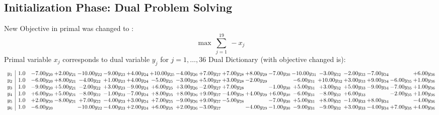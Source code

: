 \documentclass[9pt]{article}
\begin{document}
\subsection{Initialization Phase: Dual Problem Solving}
New Objective in primal was changed to : \[ \max\ \sum_{j=1}^{19}\ - x_j \] 
Primal variable $x_j$ corresponds to dual variable $y_j$ for $j = 1,\ldots,36$
Dual Dictionary (with objective changed is): 
\[\begin{array}{c| c c@{\hskip 2pt} c@{\hskip 2pt} c@{\hskip 2pt} c@{\hskip 2pt} c@{\hskip 2pt} c@{\hskip 2pt} c@{\hskip 2pt} c@{\hskip 2pt} c@{\hskip 2pt} c@{\hskip 2pt} c@{\hskip 2pt} c@{\hskip 2pt} c@{\hskip 2pt} c@{\hskip 2pt} c@{\hskip 2pt} c@{\hskip 2pt} c@{\hskip 2pt} }
 y_{1}   &  1.0 & -7.00 y_{20} & +  2.00 y_{21} & -10.00 y_{22} & -9.00 y_{23} & +  4.00 y_{24} & + 10.00 y_{25} & -4.00 y_{26} & +  7.00 y_{27} & +  7.00 y_{28} & +  8.00 y_{29} & -7.00 y_{30} & -10.00 y_{31} & -3.00 y_{32} & -2.00 y_{33} & -7.00 y_{34} &   & +  6.00 y_{36}\\
 y_{2}   &  1.0 & -6.00 y_{20} & +  8.00 y_{21} & -4.00 y_{22} & +  1.00 y_{23} & +  4.00 y_{24} & -5.00 y_{25} & -3.00 y_{26} & +  5.00 y_{27} & +  3.00 y_{28} & -2.00 y_{29} &   & -6.00 y_{31} & + 10.00 y_{32} & +  3.00 y_{33} & +  9.00 y_{34} & -6.00 y_{35} & +  1.00 y_{36}\\
 y_{3}   &  1.0 & -9.00 y_{20} & +  5.00 y_{21} & -2.00 y_{22} & +  3.00 y_{23} & -9.00 y_{24} & +  6.00 y_{25} & +  3.00 y_{26} & -2.00 y_{27} & +  7.00 y_{28} &   & -1.00 y_{30} & +  5.00 y_{31} & +  3.00 y_{32} & +  5.00 y_{33} & -9.00 y_{34} & -7.00 y_{35} & +  1.00 y_{36}\\
 y_{4}   &  1.0 & +  6.00 y_{20} & +  5.00 y_{21} & -8.00 y_{22} & -1.00 y_{23} & -7.00 y_{24} & +  8.00 y_{25} & +  8.00 y_{26} & +  9.00 y_{27} & -4.00 y_{28} & +  4.00 y_{29} & +  6.00 y_{30} & -6.00 y_{31} & -8.00 y_{32} & +  6.00 y_{33} &   & -2.00 y_{35} & +  1.00 y_{36}\\
 y_{5}   &  1.0 & +  2.00 y_{20} & -8.00 y_{21} & +  7.00 y_{22} & -4.00 y_{23} & +  3.00 y_{24} & +  7.00 y_{25} & -9.00 y_{26} & +  9.00 y_{27} & -5.00 y_{28} &   & -7.00 y_{30} & +  5.00 y_{31} & +  8.00 y_{32} & -1.00 y_{33} & +  8.00 y_{34} &   & -4.00 y_{36}\\
 y_{6}   &  1.0 & -6.00 y_{20} &   & -10.00 y_{22} & -4.00 y_{23} & +  2.00 y_{24} & +  6.00 y_{25} & +  2.00 y_{26} & -3.00 y_{27} &   & -4.00 y_{29} & -1.00 y_{30} & -9.00 y_{31} & -9.00 y_{32} & +  3.00 y_{33} & -4.00 y_{34} & +  7.00 y_{35} & +  4.00 y_{36}\\

\end{array}\]
\end{document}
